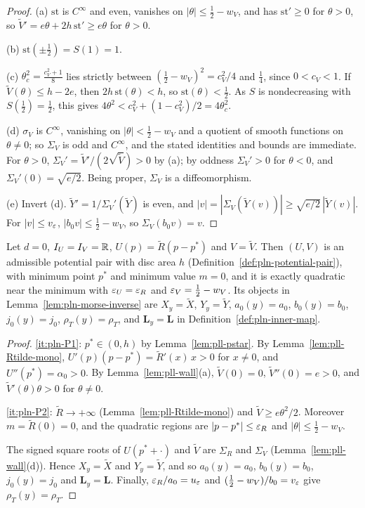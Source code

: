 \begin{proof}
(a) $\mathrm{st}$ is $C^\infty$ and even, vanishes on $|\theta|\le\frac12-w_V$, and has $\mathrm{st}'\ge0$ for $\theta>0$, so $\tilde V'=e\theta+2h\,\mathrm{st}'\ge e\theta$ for $\theta>0$.

(b) $\mathrm{st}(\pm\frac12)=S(1)=1$.

(c) $\theta_c^2=\frac{c_V^2+1}8$ lies strictly between $(\frac12-w_V)^2=c_V^2/4$ and $\frac14$, since $0<c_V<1$. If $\tilde V(\theta)\le h-2e$, then $2h\,\mathrm{st}(\theta)<h$, so $\mathrm{st}(\theta)<\frac12$. As $S$ is nondecreasing with $S(\frac12)=\frac12$, this gives $4\theta^2<c_V^2+(1-c_V^2)/2=4\theta_c^2$.

(d) $\sigma_V$ is $C^\infty$, vanishing on $|\theta|<\frac12-w_V$ and a quotient of smooth functions on $\theta\ne0$; so $\Sigma_V$ is odd and $C^\infty$, and the stated identities and bounds are immediate. For $\theta>0$, $\Sigma_V'=\tilde V'/(2\sqrt{\tilde V})>0$ by (a); by oddness $\Sigma_V'>0$ for $\theta<0$, and $\Sigma_V'(0)=\sqrt{e/2}$. Being proper, $\Sigma_V$ is a diffeomorphism.

(e) Invert (d). $\tilde Y'=1/\Sigma_V'(\tilde Y)$ is even, and $|v|=|\Sigma_V(\tilde Y(v))|\ge\sqrt{e/2}\,|\tilde Y(v)|$. For $|v|\le v_\varepsilon$, $|b_0v|\le\frac12-w_V$, so $\Sigma_V(b_0v)=v$.
\end{proof}

\begin{lemma}\label{lem:pll-pair}
Let $d=0$, $I_U=I_V=\mathbb{R}$, $U(p)=\tilde R(p-p^*)$ and $V=\tilde V$. Then $(U,V)$ is an admissible potential pair with
disc area $h$ (Definition~\ref{def:pln-potential-pair}), with minimum point $p^*$ and minimum value $m=0$, and it is
exactly quadratic near the minimum with $\varepsilon_U=\varepsilon_R$ and $\varepsilon_V=\frac12-w_V$. Its objects in
Lemma~\ref{lem:pln-morse-inverse} are $X_y=\tilde X$, $Y_y=\tilde Y$, $a_0(y)=a_0$, $b_0(y)=b_0$, $j_0(y)=j_0$,
$\rho_T(y)=\rho_T$, and $\mathbf L_y=\mathbf L$ in Definition~\ref{def:pln-inner-map}.
\end{lemma}

\begin{proof}
\ref{it:pln-P1}: $p^*\in(0,h)$ by Lemma~\ref{lem:pll-pstar}. By Lemma~\ref{lem:pll-Rtilde-mono}, $U'(p)(p-p^*)=\tilde R'(x)\,x>0$ for $x\ne0$, and $U''(p^*)=\alpha_0>0$. By Lemma~\ref{lem:pll-wall}(a), $\tilde V(0)=0$, $\tilde V''(0)=e>0$, and $\tilde V'(\theta)\theta>0$ for $\theta\ne0$.

\ref{it:pln-P2}: $\tilde R\to+\infty$ (Lemma~\ref{lem:pll-Rtilde-mono}) and $\tilde V\ge e\theta^2/2$. Moreover $m=\tilde R(0)=0$, and the quadratic regions are $|p-p^*|\le\varepsilon_R$ and $|\theta|\le\frac12-w_V$.

The signed square roots of $U(p^*+\cdot)$ and $\tilde V$ are $\Sigma_R$ and $\Sigma_V$ (Lemma~\ref{lem:pll-wall}(d)). Hence $X_y=\tilde X$ and $Y_y=\tilde Y$, and so $a_0(y)=a_0$, $b_0(y)=b_0$, $j_0(y)=j_0$ and $\mathbf L_y=\mathbf L$. Finally, $\varepsilon_R/a_0=u_\varepsilon$ and $(\frac12-w_V)/b_0=v_\varepsilon$ give $\rho_T(y)=\rho_T$.
\end{proof}

